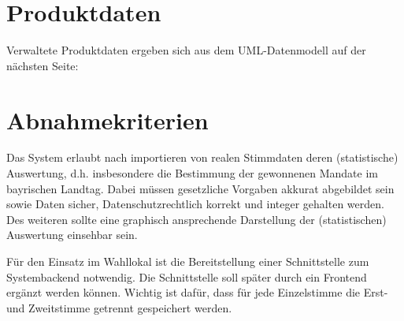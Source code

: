 \documentclass[a4paper,12pt]{article}
\begin{document}
\section{Produktdaten}
Verwaltete Produktdaten ergeben sich aus dem UML-Datenmodell auf der nächsten Seite:
%

\begin{figure}[H]
	\centering
\end{figure}

\section{Abnahmekriterien}
Das System erlaubt nach importieren von realen Stimmdaten deren (statistische) Auswertung, d.h. 
insbesondere die Bestimmung der gewonnenen Mandate im bayrischen Landtag. Dabei müssen gesetzliche
Vorgaben akkurat abgebildet sein sowie Daten sicher, Datenschutzrechtlich korrekt und integer gehalten
werden. Des weiteren sollte eine graphisch ansprechende Darstellung der (statistischen) Auswertung
einsehbar sein. 

Für den Einsatz im Wahllokal ist die Bereitstellung einer Schnittstelle zum Systembackend notwendig. Die Schnittstelle soll später durch ein Frontend ergänzt werden können. Wichtig ist dafür, dass für jede Einzelstimme die Erst- und Zweitstimme getrennt gespeichert werden. 


%  
\end{document}
